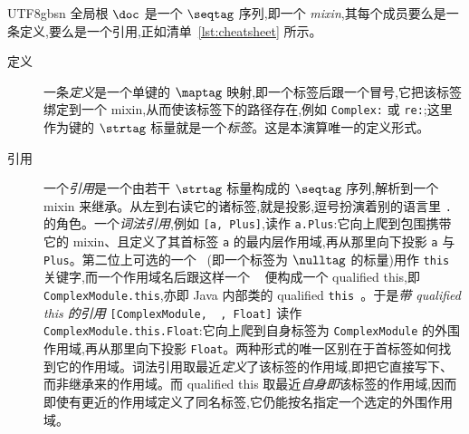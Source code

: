 \begin{CJK*}{UTF8}{gbsn}
\ifPaperChinese
全局根 $\doc$ 是一个 $\seqtag$ 序列,即一个 \emph{mixin},其每个成员要么是一条定义,要么是一个引用,正如清单~\ref{lst:cheatsheet} 所示。
\begin{description}
  \item[定义]
    一条\emph{定义}是一个单键的 $\maptag$ 映射,即一个标签后跟一个冒号,它把该标签绑定到一个 mixin,从而使该标签下的路径存在,例如 \texttt{Complex:} 或 \texttt{re:};这里作为键的 $\strtag$ 标量就是一个\emph{标签}。这是本演算唯一的定义形式。

  \item[引用]
    一个\emph{引用}是一个由若干 $\strtag$ 标量构成的 $\seqtag$ 序列,解析到一个 mixin 来继承。从左到右读它的诸标签,就是投影,逗号扮演着别的语言里 \texttt{.} 的角色。一个\emph{词法引用},例如 \texttt{[a, Plus]},读作 \texttt{a.Plus}:它向上爬到包围携带它的 mixin、且定义了其首标签 \texttt{a} 的最内层作用域,再从那里向下投影 \texttt{a} 与 \texttt{Plus}。第二位上可选的一个 \texttt{~}(即一个标签为 $\nulltag$ 的标量)用作 \texttt{this} 关键字,而一个作用域名后跟这样一个 \texttt{~} 便构成一个 qualified this,即 \texttt{ComplexModule.this},亦即 Java 内部类的 qualified \texttt{this}~\cite{gosling2000-java-language-specification}。于是\emph{带 qualified this 的引用} \texttt{[ComplexModule, ~, Float]} 读作 \texttt{ComplexModule.this.Float}:它向上爬到自身标签为 \texttt{ComplexModule} 的外围作用域,再从那里向下投影 \texttt{Float}。两种形式的唯一区别在于首标签如何找到它的作用域。词法引用取最近\emph{定义}了该标签的作用域,即把它直接写下、而非继承来的作用域。而 qualified this 取最近\emph{自身即}该标签的作用域,因而即使有更近的作用域定义了同名标签,它仍能按名指定一个选定的外围作用域。


\end{description}
\end{CJK*}
